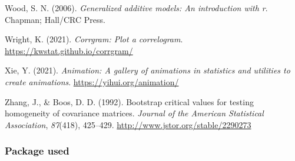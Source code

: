 \documentclass[
  letterpaper,
  10pt,
  krantz2]{krantz}
\newlength{\cslhangindent}
\newlength{\cslentryspacingunit} %
\newenvironment{CSLReferences}[2] %
 {%
  \setlength{\parindent}{0pt}
  \ifodd #1
  \let\oldpar\par
  \def\par{\hangindent=\cslhangindent\oldpar}
  \fi
  \setlength{\parskip}{#2\cslentryspacingunit}
 }%
 {}
\begin{document}
\begin{CSLReferences}{1}{0}
\leavevmode{}%
Wood, S. N. (2006). \emph{Generalized additive models: An introduction
with r}. Chapman; Hall/CRC Press.

\leavevmode{}%
Wright, K. (2021). \emph{Corrgram: Plot a correlogram}.
\url{https://kwstat.github.io/corrgram/}

\leavevmode{}%
Xie, Y. (2021). \emph{Animation: A gallery of animations in statistics
and utilities to create animations}. \url{https://yihui.org/animation/}

\leavevmode{}%
Zhang, J., \& Boos, D. D. (1992). Bootstrap critical values for testing
homogeneity of covariance matrices. \emph{Journal of the American
Statistical Association}, \emph{87}(418), 425--429.
\url{http://www.jstor.org/stable/2290273}

\end{CSLReferences}

\hypertarget{package-used}{%
\subsubsection*{Package used}\label{package-used}}



\backmatter
\printindex
\end{document}
